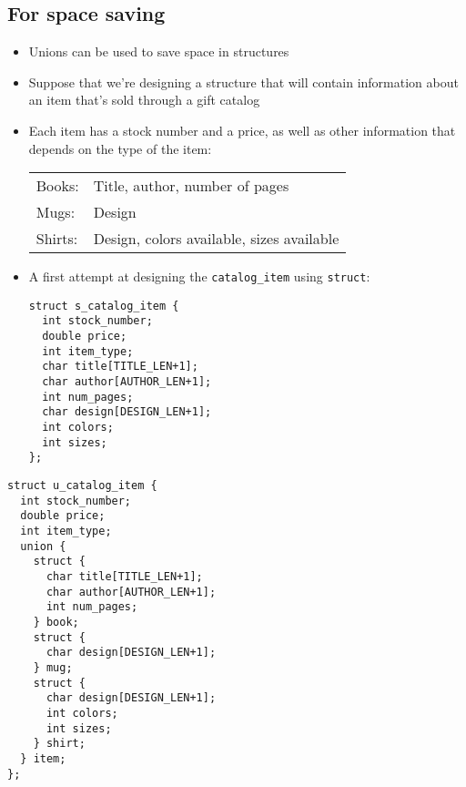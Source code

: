 \documentclass{article}
\begin{document}
\subsection{For space saving}
\begin{itemize}
\item Unions can be used to save space in structures
\item Suppose that we're designing a structure that will contain information about an item that's sold through a gift catalog
\item Each item has a stock number and a price, as well as other information that depends on the type of the item:
\begin{tabular}{ll}
Books: & Title, author, number of pages\\
Mugs: & Design\\
Shirts: & Design, colors available, sizes available\\
\end{tabular}

\item A first attempt at designing the \verb!catalog_item! using \verb!struct!:
\begin{verbatim}
struct s_catalog_item {
  int stock_number;
  double price;
  int item_type;
  char title[TITLE_LEN+1];
  char author[AUTHOR_LEN+1];
  int num_pages;
  char design[DESIGN_LEN+1];
  int colors;
  int sizes;
};
\end{verbatim}
\end{itemize}



\begin{verbatim}
struct u_catalog_item {
  int stock_number;
  double price;
  int item_type;
  union {
    struct {
      char title[TITLE_LEN+1];
      char author[AUTHOR_LEN+1];
      int num_pages;
    } book;
    struct {
      char design[DESIGN_LEN+1];
    } mug;
    struct {
      char design[DESIGN_LEN+1];
      int colors;
      int sizes;
    } shirt;
  } item;
};
\end{verbatim}
\end{document}
